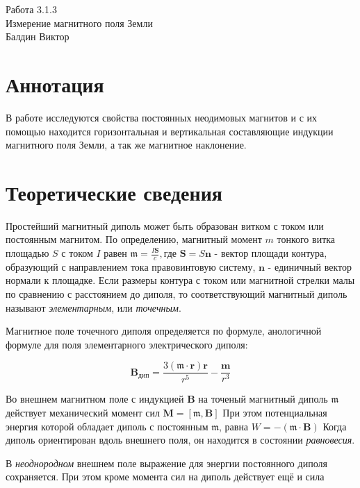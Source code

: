 \documentclass[a4paper,12pt]{article}
\begin{document}
\begin{center}
  \LARGE{Работа 3.1.3}\\[0.2cm]
  \LARGE{Измерение магнитного поля Земли}\\[0.2cm]
  \large{Балдин Виктор}\\[0.2cm]
\end{center}


\section{Аннотация}

В работе исследуются свойства постоянных неодимовых магнитов и с их помощью находится горизонтальная и вертикальная составляющие индукции магнитного поля Земли, а так же магнитное наклонение.

\section{Теоретические сведения}

Простейший магнитный диполь может быть образован витком с током или постоянным магнитом. По определению, магнитный момент $m$ тонкого витка площадью $S$ с током $I$ равен $\mathfrak{m} = \frac{I\textbf{S}}{c}, $где $\textbf{S} = S\textbf{n}$ - вектор площади контура, образующий с направлением тока правовинтовую систему, $\textbf{n}$ - единичный вектор нормали к площадке. Если размеры контура с током или магнитной стрелки малы по сравнению с расстоянием до диполя, то соответствующий магнитный диполь называют \textit{элементарным}, или \textit{точечным}.

Магнитное поле точечного диполя определяется по формуле, анологичной формуле для поля элементарного электрического диполя:

\[ \textbf{B}_{дип} = \frac{3(\mathfrak{m} \cdot \textbf{r})\textbf{r}}{r^5} - \frac{\textbf{m}}{r^3}\]

Во внешнем магнитном поле с индукцией $\textbf{B}$ на точеный магнитный диполь $\mathfrak{m}$ действует механический момент сил $\textbf{M}=[\mathfrak{m}, \textbf{B}] $
При этом потенциальная энергия которой обладает диполь с постоянным $\mathfrak{m}$, равна
$W = -(\mathfrak{m} \cdot \textbf{B})$
Когда диполь ориентирован вдоль внешнего поля, он находится в состоянии \textit{равновесия}.

В \textit{неоднородном} внешнем поле выражение для энергии постоянного диполя сохраняется. При этом кроме момента сил на диполь действует ещё и сила
\end{document}
